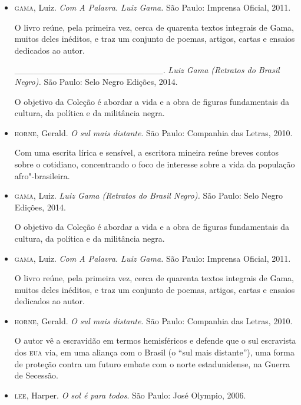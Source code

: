 \documentclass[12pt]{extarticle}
\begin{document}
\begin{itemize}
Com uma escrita lírica e sensível, a escritora mineira reúne breves
contos sobre o cotidiano, concentrando o foco de interesse sobre a vida
da população afro"-brasileira.

\item\textsc{gama}, Luiz. \textit{Com A Palavra. Luiz Gama.} São Paulo: Imprensa
Oficial, 2011.

O livro reúne, pela primeira vez, cerca de quarenta textos integrais de
Gama, muitos deles inéditos, e traz um conjunto de poemas, artigos,
cartas e ensaios dedicados ao autor.

________________________. \textit{Luiz Gama (Retratos do Brasil Negro).} São Paulo:
Selo Negro Edições, 2014.

O objetivo da Coleção é abordar a vida e a obra de figuras fundamentais
da cultura, da política e da militância negra.

\item\textsc{horne}, Gerald. \textit{O sul mais distante}. São Paulo: Companhia das
  Letras, 2010.

Com uma escrita lírica e sensível, a escritora mineira reúne breves
contos sobre o cotidiano, concentrando o foco de interesse sobre a vida
da população afro"-brasileira.

\item\textsc{gama}, Luiz. \textit{Luiz Gama (Retratos do Brasil Negro).} São Paulo:
Selo Negro Edições, 2014.

O objetivo da Coleção é abordar a vida e a obra de figuras fundamentais
da cultura, da política e da militância negra.

\item\textsc{gama}, Luiz. \textit{Com A Palavra. Luiz Gama.} São Paulo: Imprensa
Oficial, 2011.

O livro reúne, pela primeira vez, cerca de quarenta textos integrais de
Gama, muitos deles inéditos, e traz um conjunto de poemas, artigos,
cartas e ensaios dedicados ao autor.

\item\textsc{horne}, Gerald. \textit{O sul mais distante}. São Paulo: Companhia das Letras, 2010.

O autor vê a escravidão em termos hemisféricos e defende que o sul
escravista dos \textsc{eua} via, em uma aliança com o Brasil (o ``sul mais
distante''), uma forma de proteção contra um futuro embate com o norte
estadunidense, na Guerra de Secessão.

\item\textsc{lee}, Harper. \textit{O sol é para todos}. São Paulo: José Olympio,
  2006.


\end{itemize}
\end{document}
